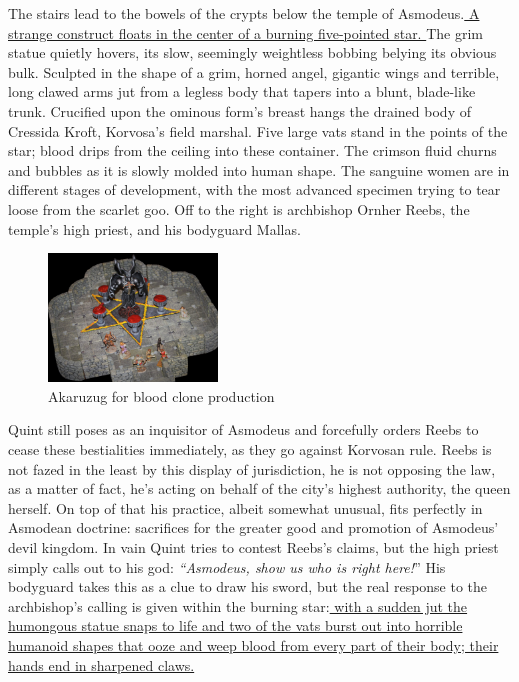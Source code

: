 The stairs lead to the bowels of the crypts below the temple of Asmodeus.\hyperref[fig:Akaruzug-for-blood-clone-production-619036747]{ A strange construct floats in the center of a burning five-pointed star. } The grim statue quietly hovers, its slow, seemingly weightless bobbing belying its obvious bulk. Sculpted in the shape of a grim, horned angel, gigantic wings and terrible, long clawed arms jut from a legless body that tapers into a blunt, blade-like trunk. Crucified upon the ominous form's breast hangs the drained body of Cressida Kroft, Korvosa's field marshal. Five large vats stand in the points of the star; blood drips from the ceiling into these container. The crimson fluid churns and bubbles as it is slowly molded into human shape. The sanguine women are in different stages of development, with the most advanced specimen trying to tear loose from the scarlet goo. Off to the right is archbishop Ornher Reebs, the temple's high priest, and his bodyguard Mallas. \\

\begin{figure}[h]
	\centering
	\includegraphics[width=0.4\textwidth]{images/Akaruzug-for-blood-clone-production-619036747_mod.jpg}
	\caption{Akaruzug for blood clone production}
	\label{fig:Akaruzug-for-blood-clone-production-619036747}
\end{figure}

Quint still poses as an inquisitor of Asmodeus and forcefully orders Reebs to cease these bestialities immediately, as they go against Korvosan rule. Reebs is not fazed in the least by this display of jurisdiction, he is not opposing the law, as a matter of fact, he's acting on behalf of the city's highest authority, the queen herself. On top of that his practice, albeit somewhat unusual, fits perfectly in Asmodean doctrine: sacrifices for the greater good and promotion of Asmodeus' devil kingdom. In vain Quint tries to contest Reebs's claims, but the high priest simply calls out to his god: {\itshape``Asmodeus, show us who is right here!}'' His bodyguard takes this as a clue to draw his sword, but the real response to the archbishop's calling is given within the burning star:\hyperref[fig:Akaruzug-in-Curse-of-the-Crimson-Throne-619030501]{ with a sudden jut the humongous statue snaps to life and two of the vats burst out into horrible humanoid shapes that ooze and weep blood from every part of their body; their hands end in sharpened claws. }  \\


